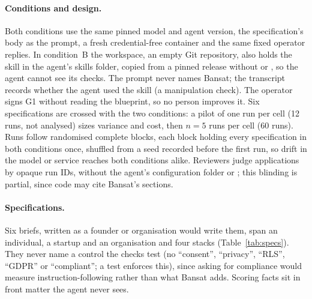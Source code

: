 \documentclass[11pt,a4paper]{article}
\DeclareRobustCommand{\fpath}[1]{\path{#1}}
\begin{document}
\paragraph{Conditions and design.} Both conditions use the same pinned model and agent version, the
specification's body as the prompt, a fresh credential-free container and the same fixed operator replies. In
condition~B the workspace, an empty Git repository, also holds the skill in the agent's skills folder, copied from a
pinned release without \fpath{research/} or \fpath{paper/}, so the agent cannot see its checks. The prompt never names
Bansat; the transcript records whether the agent used the skill (a manipulation check). The operator signs G1 without
reading the blueprint, so no person improves it. Six specifications are crossed with the two conditions: a pilot of one
run per cell (12 runs, not analysed) sizes variance and cost, then $n=5$ runs per cell (60 runs). Runs follow randomised
complete blocks, each block holding every specification in both conditions once, shuffled from a seed recorded before
the first run, so drift in the model or service reaches both conditions alike. Reviewers judge applications by opaque run
IDs, without the agent's configuration folder or \fpath{docs/BLUEPRINT.md}; this blinding is partial, since code may cite Bansat's
sections.

\paragraph{Specifications.} Six briefs, written as a founder or organisation would write them, span an individual, a
startup and an organisation and four stacks (Table~\ref{tab:specs}). They never name a control the checks test (no
``consent'', ``privacy'', ``RLS'', ``GDPR'' or ``compliant''; a test enforces this), since asking for compliance would
measure instruction-following rather than what Bansat adds. Scoring facts sit in front matter the agent never sees.
\end{document}
